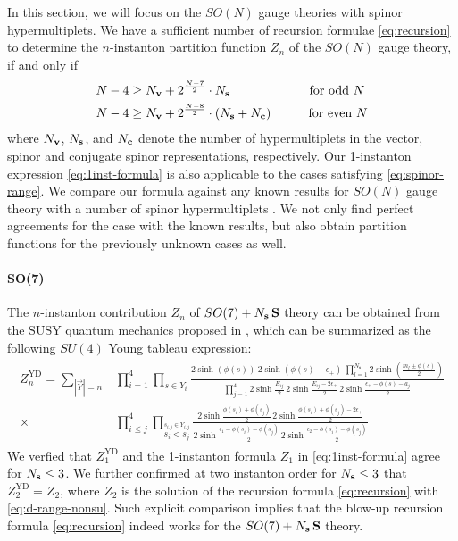 \documentclass[letterpaper, 11pt]{article}
\def\e{\epsilon}
\begin{document}
{In this section, we will focus on the $SO(N)$ gauge theories with spinor hypermultiplets.
We have a sufficient number of recursion formulae \eqref{eq:recursion} to determine the $n$-instanton partition function $Z_n$ of the $SO(N)$ gauge theory, if and only if  
\begin{align}
  \label{eq:spinor-range}
  \begin{split}
  N-4 &\geq N_{\bf v} + 2^{\frac{N-7}{2}}\cdot N_{\bf s} \qquad\qquad\qquad \text{ for odd $N$}\\
  N-4 &\geq N_{\bf v} + 2^{\frac{N-8}{2}}\cdot (N_{\bf s} + N_{\bf c})\qquad\quad \text{for even $N$}
  \end{split}
\end{align}
where $N_{\bf v}$, $N_{\bf s}$, and $N_{\bf c}$ denote the number of hypermultiplets in the vector, spinor and conjugate spinor representations, respectively. Our 1-instanton expression \eqref{eq:1inst-formula} is also applicable to the cases satisfying \eqref{eq:spinor-range}. 
We compare our formula against any known results for $SO(N)$ gauge theory with a number of spinor hypermultiplets  \cite{Kim:2018gjo, DelZotto:2018tcj}. We not only find perfect agreements for the case with the known results, but also  obtain partition functions for the previously unknown cases as well. 

\paragraph{SO(7)} The $n$-instanton contribution $Z_n$ of $SO(7) + N_{\bf s}\,\mathbf{S}$ theory can be obtained from the SUSY quantum mechanics proposed in \cite{Kim:2018gjo}, which can be summarized as the following $SU(4)$ Young tableau expression:
\begin{align}
\begin{split}
  Z_n^\text{YD} = \sum_{|\vec{Y}| = n} &\prod_{i=1}^4\prod_{s \in Y_i}\frac{2\sinh{(\phi(s))} \ 2\sinh{(\phi(s)-\e_+)} \ \prod_{l=1}^{N_\textbf{s}}2\sinh(\frac{m_l \pm \phi(s)}{2}) }{\prod_{j=1}^4 2\sinh{\frac{E_{ij}}{2}}\,2\sinh{\frac{E_{ij}-2\e_+}{2}}\,2\sinh{\frac{\e_+ - \phi(s) - a_j}{2}}} \\ \times &\prod_{i \leq j}^4 \prod_{\stackrel{s_{i,j} \in Y_{i,j}}{s_i < s_j}} \frac{2\sinh{\frac{\phi(s_i)+\phi(s_j)}{2}}\, 2\sinh{\frac{\phi(s_i)+\phi(s_j)-2\e_+}{2}}}{ 2\sinh{\frac{\e_1 - \phi(s_i)-\phi(s_j)}{2}} \, 2\sinh{\frac{\e_2 - \phi(s_i)-\phi(s_j)}{2}}}
\end{split}
\end{align}
We verfied that $Z_1^\text{YD}$ and the 1-instanton formula $Z_1$ in \eqref{eq:1inst-formula} agree for $N_{\bf s} \leq 3$. We further confirmed at two instanton order for $N_{\bf s} \leq 3$ that $Z_2^\text{YD} = Z_2$, where $Z_2$ is  the solution of the recursion formula \eqref{eq:recursion} with \eqref{eq:d-range-nonsu}. Such explicit comparison implies that the blow-up recursion formula \eqref{eq:recursion} indeed works for the $SO(7) + N_{\bf s}\,\mathbf{S}$ theory. 

}
\end{document}
